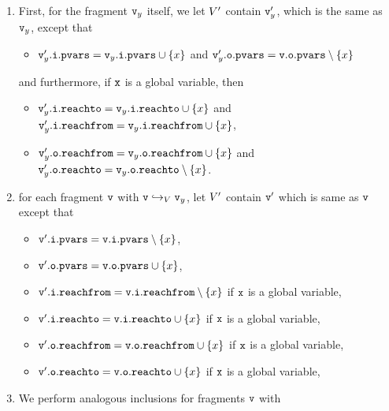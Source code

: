 \begin{enumerate}
\item
First, for the fragment $\mathtt{v}_y$ itself, we let $V'$ contain
$\mathtt{v}_y'$, which is the same as $\mathtt{v}_y$, except that
\begin{itemize}
\item $\mathtt{v}_y'.\mathtt{i}.\mathtt{pvars} = \mathtt{v}_y.\mathtt{i}.\mathtt{pvars} \cup \left\{x\right\}$ and
  $\mathtt{v}_y'.\mathtt{o}.\mathtt{pvars} = \mathtt{v}.\mathtt{o}.\mathtt{pvars} \setminus \left\{x\right\}$
\end{itemize}
and furthermore, if $\mathtt{x}$ is a global variable, then
{\small
  \begin{itemize}
\item $\mathtt{v}_y'.\mathtt{i}.\mathtt{reachto} = \mathtt{v}_y.\mathtt{i}.\mathtt{reachto} \cup \left\{x\right\}$ and
$\mathtt{v}_y'.\mathtt{i}.\mathtt{reachfrom} = \mathtt{v}_y.\mathtt{i}.\mathtt{reachfrom} \cup \left\{x\right\}$,
\item $\mathtt{v}_y'.\mathtt{o}.\mathtt{reachfrom} = \mathtt{v}_y.\mathtt{o}.\mathtt{reachfrom} \cup \left\{x\right\}$ and
$\mathtt{v}_y'.\mathtt{o}.\mathtt{reachto} = \mathtt{v}_y.\mathtt{o}.\mathtt{reachto} \setminus \left\{x\right\}$.
\end{itemize}
}
\item  for each fragment $\mathtt{v}$ with $\mathtt{v} \hookrightarrow_{V} \mathtt{v}_y$, let $V'$ contain $\mathtt{v}'$ which is same as $\mathtt{v}$ except that
\begin{itemize}
\item $\mathtt{v}'.\mathtt{i}.\mathtt{pvars} = \mathtt{v}.\mathtt{i}.\mathtt{pvars} \setminus \left\{x\right\}$,
\item $\mathtt{v}'.\mathtt{o}.\mathtt{pvars} = \mathtt{v}.\mathtt{o}.\mathtt{pvars} \cup \left\{x\right\}$,
\item $\mathtt{v}'.\mathtt{i}.\mathtt{reachfrom} = \mathtt{v}.\mathtt{i}.\mathtt{reachfrom} \setminus \left\{x\right\}$ if $\tt x$ is a global variable,
\item $\mathtt{v}'.\mathtt{i}.\mathtt{reachto} = \mathtt{v}.\mathtt{i}.\mathtt{reachto} \cup \left\{x\right\}$ if $\tt x$ is a global variable,
 \item $\mathtt{v}'.\mathtt{o}.\mathtt{reachfrom} = \mathtt{v}.\mathtt{o}.\mathtt{reachfrom} \cup \left\{x\right\}$ if $\tt x$ is a global variable,
\item $\mathtt{v}'.\mathtt{o}.\mathtt{reachto} = \mathtt{v}.\mathtt{o}.\mathtt{reachto} \cup \left\{x\right\}$ if $\tt x$ is a global variable,
\end{itemize}
\item We perform analogous inclusions for fragments $\mathtt{v}$ with

\end{enumerate}
